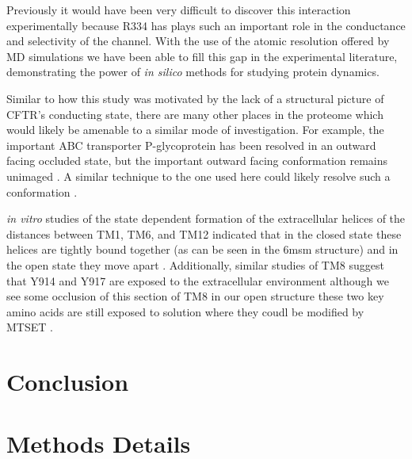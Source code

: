 Previously it would have been very difficult to discover this interaction experimentally because R334 has plays such an important role in the conductance and selectivity of the channel. With the use of the atomic resolution offered by MD simulations we have been able to fill this gap in the experimental literature, demonstrating the power of \textit {in silico} methods for studying protein dynamics.

Similar to how this study was motivated by the lack of a structural picture of CFTR's conducting state, there are many other places in the proteome which would likely be amenable to a similar mode of investigation. For example, the important ABC transporter P-glycoprotein has been resolved in an outward facing occluded state, but the important outward facing conformation remains unimaged \cite{}. A similar technique to the one used here could likely resolve such a conformation \cite{kim2018a}.

\textit {in vitro} studies of the state dependent formation of the extracellular helices of the distances between  TM1, TM6, and TM12 indicated that in the closed state these helices are tightly bound together (as can be seen in the 6msm structure) and in the open state they move apart \cite{negoda2018}. Additionally, similar studies of TM8 suggest that Y914 and Y917 are exposed to the extracellular environment although we see some occlusion of this section of TM8 in our open structure these two key amino acids are still exposed to solution where they coudl be modified by MTSET  \cite{negoda2019}.

\section{Conclusion}

\section{Methods Details}
